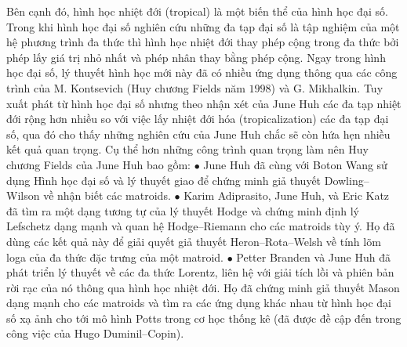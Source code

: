 \begin{multicols}{2}
	\vskip 0.1cm
	Bên cạnh đó, hình học nhiệt đới (tropical) là một biến thể của hình học đại số. Trong khi hình học đại số nghiên cứu những đa tạp đại số là tập nghiệm của một hệ phương trình đa thức thì hình học nhiệt đới thay phép cộng trong đa thức bởi phép lấy giá trị nhỏ nhất và phép nhân thay bằng phép cộng. Ngay trong hình học đại số, lý thuyết hình học mới này đã có nhiều ứng dụng thông qua các công trình của M. Kontsevich (Huy chương Fields năm $1998$) và G. Mikhalkin. Tuy xuất phát từ hình học đại số nhưng theo nhận xét của June Huh các đa tạp nhiệt đới rộng hơn nhiều so với việc lấy nhiệt đới hóa (tropicalization) các đa tạp đại số, qua đó cho thấy những nghiên cứu của June Huh chắc sẽ còn hứa hẹn nhiều kết quả quan trọng.  
	\vskip 0.1cm
	Cụ thể hơn những công trình quan trọng làm nên Huy chương Fields của June Huh bao gồm:
	\vskip 0.1cm
	$\bullet$ June Huh đã cùng với Boton Wang sử dụng Hình học đại số và lý thuyết giao để chứng minh giả thuyết Dowling--Wilson về nhận biết các matroids. 
	\vskip 0.1cm
	$\bullet$ Karim Adiprasito, June Huh, và Eric Katz đã tìm ra một dạng tương tự của lý thuyết Hodge và chứng minh định lý Lefschetz dạng mạnh và quan hệ Hodge--Riemann cho các matroids tùy ý. Họ đã dùng các kết quả này để giải quyết giả thuyết Heron--Rota--Welsh về tính lõm loga của đa thức đặc trưng của một matroid. 
	\vskip 0.1cm
	$\bullet$ Petter Branden và June Huh đã phát triển lý thuyết về các đa thức Lorentz, liên hệ với giải tích lồi và phiên bản rời rạc của nó thông qua hình học nhiệt đới. Họ đã chứng minh giả thuyết Mason dạng mạnh cho các matroids và tìm ra các ứng dụng khác nhau từ hình học đại số xạ ảnh cho tới mô hình Potts trong cơ học thống kê (đã được đề cập đến trong công việc của Hugo Duminil--Copin).
	\vskip 0.1cm 

\end{multicols}
